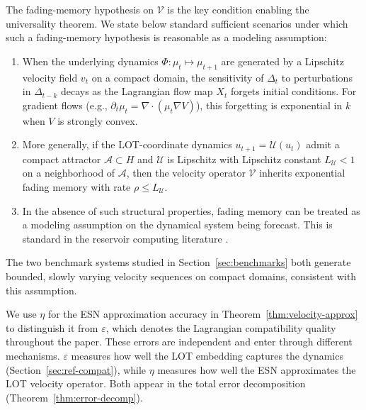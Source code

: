 \documentclass[11pt]{article}
\newcommand{\1}{\mathbf{1}}
\begin{document}
\begin{remark}\label{rem:fading-memory}
The fading-memory hypothesis on $\mathcal{V}$ is the key condition enabling
the universality theorem. We state below standard sufficient scenarios under which such a fading-memory hypothesis is reasonable as a modeling assumption:
\begin{enumerate}[label=(\roman*)]
  \item When the underlying dynamics
  $\Phi: \mu_t \mapsto \mu_{t+1}$ are generated by a Lipschitz velocity
  field $v_t$ on a compact domain, the sensitivity of $\Delta_t$ to
  perturbations in $\Delta_{t-k}$ decays as the
  Lagrangian flow map $X_t$ forgets initial conditions. For gradient flows
  (e.g., $\partial_t \mu_t = \nabla \cdot (\mu_t \nabla V)$), this
  forgetting is exponential in $k$ when $V$ is strongly convex.
  \item More generally, if the LOT-coordinate dynamics $u_{t+1} =
  \mathcal{U}(u_t)$ admit a compact attractor $\mathcal{A} \subset H$ and
  $\mathcal{U}$ is Lipschitz with Lipschitz constant $L_{\mathcal{U}} < 1$
  on a neighborhood of $\mathcal{A}$, then the velocity operator
  $\mathcal{V}$ inherits exponential fading memory with rate
  $\rho \leq L_{\mathcal{U}}$.
  \item In the absence of such structural properties, fading memory can be
  treated as a modeling assumption on the dynamical system being forecast.
  This is standard in the reservoir computing literature \cite{BoydChua1985,GrigoryevaOrtega2018}.
\end{enumerate}
The two benchmark systems studied in Section~\ref{sec:benchmarks} both
generate bounded, slowly varying velocity sequences on compact domains,
consistent with this assumption.
\end{remark}

\begin{remark}\label{rem:eta-vs-eps}
We use $\eta$ for the ESN approximation accuracy in
Theorem~\ref{thm:velocity-approx} to distinguish it from $\varepsilon$,
which denotes the Lagrangian compatibility quality throughout the paper. These errors are independent and enter through different mechanisms. $\varepsilon$ measures how well the LOT embedding captures the dynamics (Section~\ref{sec:ref-compat}), while $\eta$ measures
how well the ESN approximates the LOT velocity operator. Both appear in the total error decomposition (Theorem~\ref{thm:error-decomp}).
\end{remark}
\end{document}
